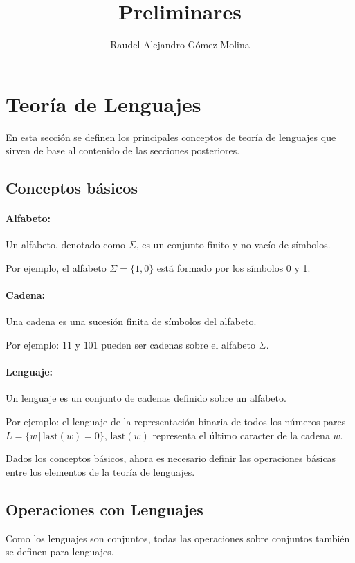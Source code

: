 \documentclass[12pt]{article}
\title{Preliminares}
\author{Raudel Alejandro Gómez Molina}
\begin{document}
\maketitle

\section{Teoría de Lenguajes}

En esta sección se definen los principales conceptos de teoría de lenguajes que sirven de base al contenido de las secciones posteriores.

\subsection{Conceptos básicos}

\paragraph{Alfabeto:} Un alfabeto, denotado como $\Sigma$, es un conjunto finito y no vacío de símbolos.

Por ejemplo, el alfabeto $\Sigma=\{1,0\}$ está formado por los símbolos 0 y 1.

\paragraph{Cadena:} Una cadena es una sucesión finita de símbolos del alfabeto.

Por ejemplo: $11$ y $101$ pueden ser cadenas sobre el alfabeto $\Sigma$.

\paragraph{Lenguaje:} Un lenguaje es un conjunto de cadenas definido sobre un alfabeto.

Por ejemplo: el lenguaje de la
representación binaria de todos los números pares $L=\{w\,|\,\text{last}(w)=0\}$, $\text{last}(w)$
representa el último caracter de la cadena $w$.

Dados los conceptos básicos, ahora es necesario definir las operaciones básicas entre los elementos de la teoría de lenguajes.

\subsection{Operaciones con Lenguajes}

Como los lenguajes son conjuntos, todas las operaciones sobre conjuntos también se definen para lenguajes.
\end{document}
